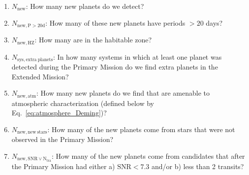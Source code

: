 \begin{enumerate}
	\item $N_\mathrm{new}$: How many new planets do we detect?
	\item $N_\mathrm{new,P>20d}$: How many of these new planets have periods $>20$ days?
	\item $N_\mathrm{new,HZ}$: How many are in the habitable zone?
	\item $N_\mathrm{sys,extra\ planets}$: In how many systems in which at least one planet was detected during the Primary Mission do we find extra planets in the Extended Mission?
	\item $N_\mathrm{new,atm}$: How many new planets do we find that are amenable to atmospheric characterization (defined below by Eq.~\ref{eq:atmosphere_Deming})?
	\item $N_\mathrm{new,new\ stars}$: How many of the new planets come from 
	stars that were not observed in the Primary Mission? 
	\item $N_\mathrm{new,SNR\lor N_{tra}}$: How many of the new planets come 
	from candidates that after the Primary Mission had either a) 
	$\mathrm{SNR}<7.3$ and/or b) less than 2 transits?
\end{enumerate}
